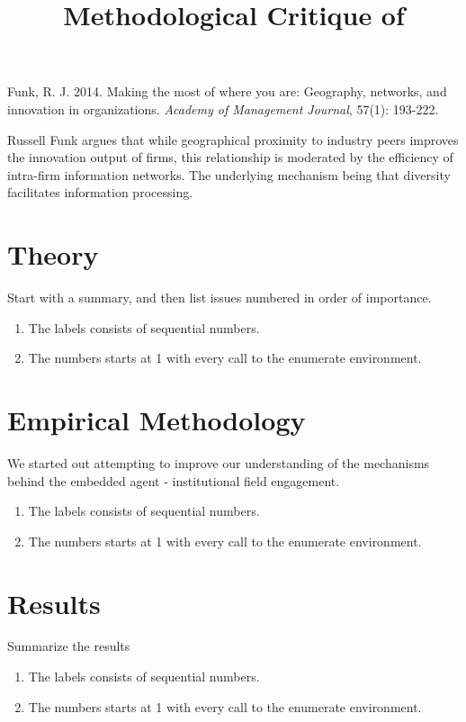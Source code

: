 \documentclass[12pt,letterpaper]{article}
\begin{document}
\title{Methodological Critique of \cite{Funk2014}\vspace{-2cm}}
\date{}
\maketitle

\pagestyle{fancy}
\fancyhf{}
\rhead{\thepage}

Funk, R. J. 2014. Making the most of where you are: Geography, networks, and innovation in organizations. \textit{Academy of Management Journal}, 57(1): 193-222.\vspace{1cm}

Russell Funk argues that while geographical proximity to industry peers improves the innovation output of firms, this relationship is moderated by the efficiency of intra-firm information networks. The underlying mechanism being that diversity facilitates information processing.


\section{Theory}
Start with a summary, and then list issues numbered in order of importance.
\begin{enumerate}
  \item The labels consists of sequential numbers.
  \item The numbers starts at 1 with every call to the enumerate environment.
\end{enumerate}
\section{Empirical Methodology}
We started out attempting to improve our understanding of the mechanisms behind the embedded agent - institutional field engagement. 
\begin{enumerate}
  \item The labels consists of sequential numbers.
  \item The numbers starts at 1 with every call to the enumerate environment.
\end{enumerate}

\section{Results}
Summarize the results
\begin{enumerate}
  \item The labels consists of sequential numbers.
  \item The numbers starts at 1 with every call to the enumerate environment.
\end{enumerate}
\end{document}
